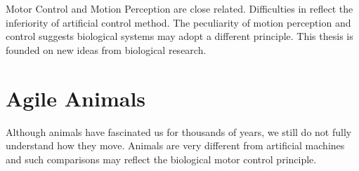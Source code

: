 Motor Control and Motion Perception are close related.
Difficulties in \cms reflect the inferiority of artificial control method.
The peculiarity of motion perception and control suggests  biological systems may adopt a different principle.
This thesis is founded on new ideas from biological research.

 

\section{Agile Animals}
Although animals have fascinated us for thousands of years, we still do not fully understand how they move.
Animals are very different from artificial machines and such comparisons may reflect the  biological motor control principle.

